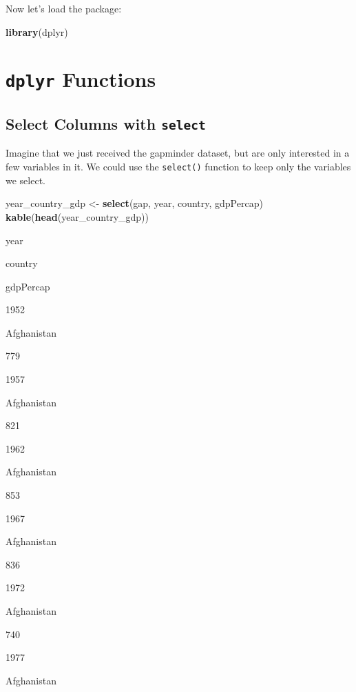 \documentclass[]{book}
\newenvironment{Shaded}{\begin{snugshade}}{\end{snugshade}}
\newcommand{\KeywordTok}[1]{\textcolor[rgb]{0.13,0.29,0.53}{\textbf{#1}}}
\newcommand{\StringTok}[1]{\textcolor[rgb]{0.31,0.60,0.02}{#1}}
\newcommand{\NormalTok}[1]{#1}
\begin{document}
Now let's load the package:

\begin{Shaded}
\begin{Highlighting}[]
\KeywordTok{library}\NormalTok{(dplyr)}
\end{Highlighting}
\end{Shaded}

\section{\texorpdfstring{\texttt{dplyr}
Functions}{dplyr Functions}}\label{dplyr-functions}

\subsection{\texorpdfstring{Select Columns with
\texttt{select}}{Select Columns with select}}\label{select-columns-with-select}

Imagine that we just received the gapminder dataset, but are only
interested in a few variables in it. We could use the \texttt{select()}
function to keep only the variables we select.

\begin{Shaded}
\begin{Highlighting}[]
\NormalTok{year_country_gdp <-}\StringTok{ }\KeywordTok{select}\NormalTok{(gap, year, country, gdpPercap)}
\KeywordTok{kable}\NormalTok{(}\KeywordTok{head}\NormalTok{(year_country_gdp))}
\end{Highlighting}
\end{Shaded}

year

country

gdpPercap

1952

Afghanistan

779

1957

Afghanistan

821

1962

Afghanistan

853

1967

Afghanistan

836

1972

Afghanistan

740

1977

Afghanistan
\end{document}
